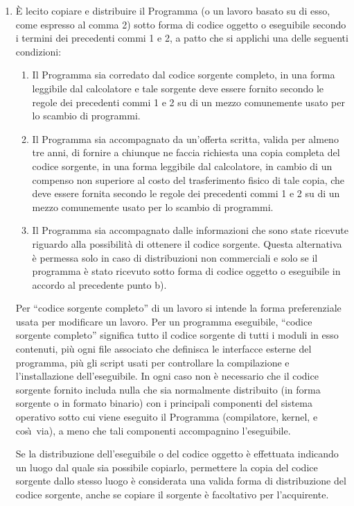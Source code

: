\begin{enumerate}
\item \`E lecito copiare e distribuire il Programma (o un
  lavoro basato su di esso, come espresso al comma 2) sotto
  forma di codice oggetto o eseguibile secondo i termini dei
  precedenti commi 1 e 2, a patto che si applichi una delle
  seguenti condizioni:

  \begin{enumerate}
  \item Il Programma sia corredato dal codice sorgente
    completo, in una forma leggibile dal calcolatore e tale
    sorgente deve essere fornito secondo le regole dei
    precedenti commi 1 e 2 su di un mezzo comunemente usato
    per lo scambio di programmi.

  \item Il Programma sia accompagnato da un'offerta scritta,
    valida per almeno tre anni, di fornire a chiunque ne
    faccia richiesta una copia completa del codice sorgente,
    in una forma leggibile dal calcolatore, in cambio di un
    compenso non superiore al costo del trasferimento fisico
    di tale copia, che deve essere fornita secondo le regole
    dei precedenti commi 1 e 2 su di un mezzo comunemente
    usato per lo scambio di programmi.

  \item Il Programma sia accompagnato dalle informazioni che
    sono state ricevute riguardo alla possibilit\`a di
    ottenere il codice sorgente.  Questa alternativa \`e
    permessa solo in caso di distribuzioni non commerciali e
    solo se il programma \`e stato ricevuto sotto forma di
    codice oggetto o eseguibile in accordo al precedente
    punto b).
  \end{enumerate}

  Per ``codice sorgente completo'' di un lavoro si intende
  la forma preferenziale usata per modificare un lavoro. Per
  un programma eseguibile, ``codice sorgente completo''
  significa tutto il codice sorgente di tutti i moduli in
  esso contenuti, pi\`u ogni file associato che definisca le
  interfacce esterne del programma, pi\`u gli script usati
  per controllare la compilazione e l'installazione
  dell'eseguibile. In ogni caso non \`e necessario che il
  codice sorgente fornito includa nulla che sia normalmente
  distribuito (in forma sorgente o in formato binario) con i
  principali componenti del sistema operativo sotto cui
  viene eseguito il Programma (compilatore, kernel, e
  cos\`\i\ via), a meno che tali componenti accompagnino
  l'eseguibile.

  Se la distribuzione dell'eseguibile o del codice oggetto
  \`e effettuata indicando un luogo dal quale sia possibile
  copiarlo, permettere la copia del codice sorgente dallo
  stesso luogo \`e considerata una valida forma di
  distribuzione del codice sorgente, anche se copiare il
  sorgente \`e facoltativo per l'acquirente.


\end{enumerate}
